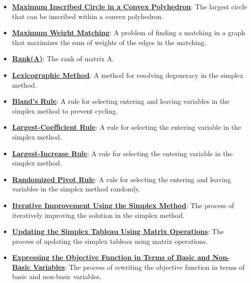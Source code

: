 \documentclass{article}%
\begin{document}
\begin{itemize}[leftmargin=*]
\item \href{https://www.math.purdue.edu/~yipn/421/2024-11-14-NetAppls.pdf#page=7}{\textbf{Maximum Inscribed Circle in a Convex Polyhedron}}: The largest circle that can be inscribed within a convex polyhedron.%
\item \href{https://www.math.purdue.edu/~yipn/421/2024-11-14-NetAppls.pdf#page=7}{\textbf{Maximum Weight Matching}}: A problem of finding a matching in a graph that maximizes the sum of weights of the edges in the matching.%
\item \href{https://www.math.purdue.edu/~yipn/421/2024-11-14-NetAppls.pdf#page=7}{\textbf{Rank(A)}}: The rank of matrix A.%
\item \href{https://www.math.purdue.edu/~yipn/421/2024-11-14-NetAppls.pdf#page=7}{\textbf{Lexicographic Method}}: A method for resolving degeneracy in the simplex method.%
\item \href{https://www.math.purdue.edu/~yipn/421/2024-11-14-NetAppls.pdf#page=7}{\textbf{Bland's Rule}}: A rule for selecting entering and leaving variables in the simplex method to prevent cycling.%
\item \href{https://www.math.purdue.edu/~yipn/421/2024-11-14-NetAppls.pdf#page=7}{\textbf{Largest{-}Coefficient Rule}}: A rule for selecting the entering variable in the simplex method.%
\item \href{https://www.math.purdue.edu/~yipn/421/2024-11-14-NetAppls.pdf#page=7}{\textbf{Largest{-}Increase Rule}}: A rule for selecting the entering variable in the simplex method.%
\item \href{https://www.math.purdue.edu/~yipn/421/2024-11-14-NetAppls.pdf#page=7}{\textbf{Randomized Pivot Rule}}: A rule for selecting the entering and leaving variables in the simplex method randomly.%
\item \href{https://www.math.purdue.edu/~yipn/421/2024-11-14-NetAppls.pdf#page=7}{\textbf{Iterative Improvement Using the Simplex Method}}: The process of iteratively improving the solution in the simplex method.%
\item \href{https://www.math.purdue.edu/~yipn/421/2024-11-14-NetAppls.pdf#page=7}{\textbf{Updating the Simplex Tableau Using Matrix Operations}}: The process of updating the simplex tableau using matrix operations.%
\item \href{https://www.math.purdue.edu/~yipn/421/2024-11-14-NetAppls.pdf#page=7}{\textbf{Expressing the Objective Function in Terms of Basic and Non{-}Basic Variables}}: The process of rewriting the objective function in terms of basic and non-basic variables.%

\end{itemize}
\end{document}
